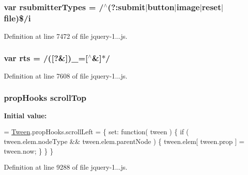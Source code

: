 \subsubsection[{rsubmitter\+Types}]{\setlength{\rightskip}{0pt plus 5cm}var rsubmitter\+Types = /$^\wedge$(?\+:submit$\vert${\bf button}$\vert$image$\vert$reset$\vert$file)\$/{\bf i}}\label{_scripts_2jquery-1_810_82_8js_a0e9cd4ca08945afe827846f34a36c74a}


Definition at line 7472 of file jquery-\/1...\+js.

\hypertarget{_scripts_2jquery-1_810_82_8js_a38ff30904f54277281a13514d7aea00d}{}
\subsubsection[{rts}]{\setlength{\rightskip}{0pt plus 5cm}var rts = /(\mbox{[}?\&\mbox{]})\+\_\+=\mbox{[}$^\wedge$\&\mbox{]}$\ast$/}\label{_scripts_2jquery-1_810_82_8js_a38ff30904f54277281a13514d7aea00d}


Definition at line 7608 of file jquery-\/1...\+js.

\hypertarget{_scripts_2jquery-1_810_82_8js_a57beb1f611d6c8b84919b0f7d9e0e890}{}
\subsubsection[{scroll\+Top}]{ {\bf prop\+Hooks} scroll\+Top}\label{_scripts_2jquery-1_810_82_8js_a57beb1f611d6c8b84919b0f7d9e0e890}
{\bfseries Initial value\+:}
\begin{DoxyCode}
= \hyperlink{obj_2_release_2_package_2_package_tmp_2_scripts_2jquery-1_810_82_8js_a91e55267cc469e865a6a7c6cfc51c7b1}{Tween}.propHooks.scrollLeft = \{
    set: \textcolor{keyword}{function}( tween ) \{
        \textcolor{keywordflow}{if} ( tween.elem.nodeType && tween.elem.parentNode ) \{
            tween.elem[ tween.prop ] = tween.now;
        \}
    \}
\}
\end{DoxyCode}


Definition at line 9288 of file jquery-\/1...\+js.

\hypertarget{_scripts_2jquery-1_810_82_8js_afa6806c6ee5e63d5177f1dcc082ba6bc}{}
